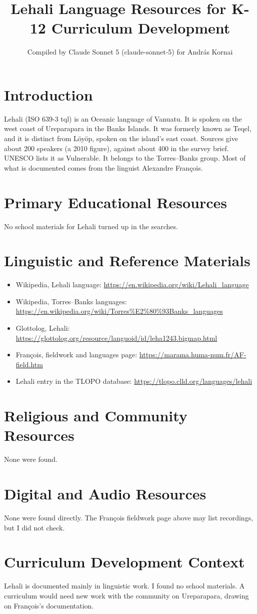 \documentclass[12pt]{article}
\title{Lehali Language Resources for K-12 Curriculum Development}
\author{Compiled by Claude Sonnet 5 (claude-sonnet-5) for Andr\'as Kornai}
\date{}
\begin{document}
\maketitle

\section{Introduction}
Lehali (ISO 639-3 tql) is an Oceanic language of Vanuatu. It is spoken on the west coast of Ureparapara in the Banks Islands. It was formerly known as Teqel, and it is distinct from L\"oy\"op, spoken on the island's east coast. Sources give about 200 speakers (a 2010 figure), against about 400 in the survey brief. UNESCO lists it as Vulnerable. It belongs to the Torres--Banks group. Most of what is documented comes from the linguist Alexandre Fran\c{c}ois.

\section{Primary Educational Resources}
No school materials for Lehali turned up in the searches.

\section{Linguistic and Reference Materials}
\begin{itemize}
\item Wikipedia, Lehali language: \url{https://en.wikipedia.org/wiki/Lehali_language}
\item Wikipedia, Torres--Banks languages: \url{https://en.wikipedia.org/wiki/Torres%E2%80%93Banks_languages}
\item Glottolog, Lehali: \url{https://glottolog.org/resource/languoid/id/leha1243.bigmap.html}
\item Fran\c{c}ois, fieldwork and languages page: \url{https://marama.huma-num.fr/AF-field.htm}
\item Lehali entry in the TLOPO database: \url{https://tlopo.clld.org/languages/lehali}
\end{itemize}

\section{Religious and Community Resources}
None were found.

\section{Digital and Audio Resources}
None were found directly. The Fran\c{c}ois fieldwork page above may list recordings, but I did not check.

\section{Curriculum Development Context}
Lehali is documented mainly in linguistic work. I found no school materials. A curriculum would need new work with the community on Ureparapara, drawing on Fran\c{c}ois's documentation.
\end{document}
